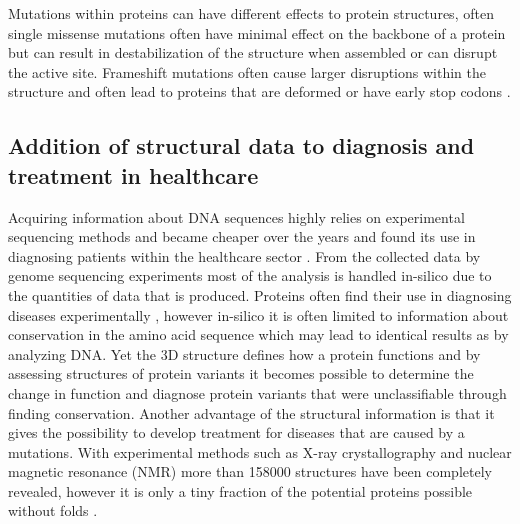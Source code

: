 Mutations within proteins can have different effects to protein structures, often single missense mutations often have minimal effect on the backbone of a protein \cite{feyfant_modeling_2007,chothia_relation_1986} but can result in destabilization of the structure when assembled or can disrupt the active site. Frameshift mutations often cause larger disruptions within the structure and often lead to proteins that are deformed or have early stop codons \cite{ogura_frameshift_2001}.
\label{subsec:GD_Structural_Levels_and_Mutation_Effects}


\subsection{Addition of structural data to diagnosis and treatment in healthcare}
Acquiring information about DNA sequences highly relies on experimental sequencing methods and became cheaper over the years \cite{} and found its use in diagnosing patients within the healthcare sector \cite{nih_cost_nodate, van_der_velde_gavin:_2017}.
From the collected data by genome sequencing experiments most of the analysis is handled in-silico due to the quantities of data that is produced. Proteins often find their use in diagnosing diseases experimentally \cite{hortin_introduction:_2010, bennion_protein_2002}, however in-silico it is often limited to information about conservation in the amino acid sequence which may lead to identical results as by analyzing DNA.
Yet the 3D structure defines how a protein functions \cite{nanev_how_2008} and by assessing structures of protein variants it becomes possible to determine the change in function and diagnose protein variants that were unclassifiable through finding conservation.
Another advantage of the structural information is that it gives the possibility to develop treatment for diseases that are caused by a mutations. 
With experimental methods such as X-ray crystallography and nuclear magnetic resonance (NMR) more than 158000 structures \cite{wwpdb_wwpdb:_nodate} have been completely revealed, however it is only a tiny fraction of the potential proteins possible without folds \cite{ cantrill_chemiotics:_nodate}.
